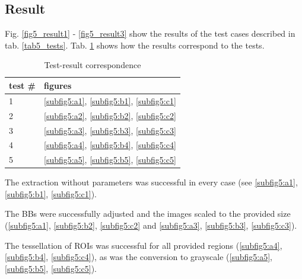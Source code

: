 \subsection{Result}

Fig. \ref{fig5_result1} - \ref{fig5_result3} show the results of the test cases described in tab. \ref{tab5_tests}. Tab. \ref{tab5_results} shows how the results correspond to the tests.

\begin{table}[H]
	\begin{center}
		\begin{tabular}{| l | l |}
			\hline
			\textbf{test \#} & \textbf{figures}\\ \hline
			1 & \ref{subfig5:a1}, \ref{subfig5:b1}, \ref{subfig5:c1}\\ \hline
			2 & \ref{subfig5:a2}, \ref{subfig5:b2}, \ref{subfig5:c2}\\ \hline
			3 & \ref{subfig5:a3}, \ref{subfig5:b3}, \ref{subfig5:c3}\\ \hline
			4 & \ref{subfig5:a4}, \ref{subfig5:b4}, \ref{subfig5:c4}\\ \hline
			5 & \ref{subfig5:a5}, \ref{subfig5:b5}, \ref{subfig5:c5}\\ \hline
		\end{tabular}
		\caption{Test-result correspondence}
		\label{tab5_results}
	\end{center}
\end{table}

The extraction without parameters was successful in every case (see \ref{subfig5:a1}, \ref{subfig5:b1}, \ref{subfig5:c1}).

The BBs were successfully adjusted and the images scaled to the provided size (\ref{subfig5:a1}, \ref{subfig5:b2}, \ref{subfig5:c2} and \ref{subfig5:a3}, \ref{subfig5:b3}, \ref{subfig5:c3}).

The tessellation of ROIs was successful for all provided regions (\ref{subfig5:a4}, \ref{subfig5:b4}, \ref{subfig5:c4}), as was the conversion to grayscale (\ref{subfig5:a5}, \ref{subfig5:b5}, \ref{subfig5:c5}).

